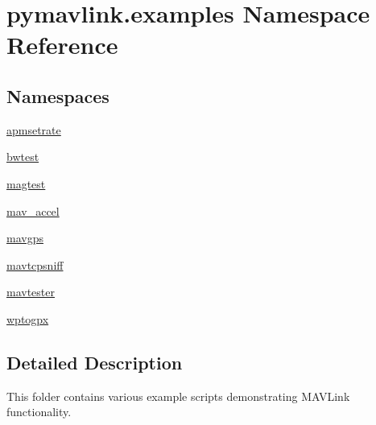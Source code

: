 \hypertarget{namespacepymavlink_1_1examples}{}\section{pymavlink.\+examples Namespace Reference}
\label{namespacepymavlink_1_1examples}
\subsection*{Namespaces}
\begin{DoxyCompactItemize}
\item 
 \hyperlink{namespacepymavlink_1_1examples_1_1apmsetrate}{apmsetrate}
\item 
 \hyperlink{namespacepymavlink_1_1examples_1_1bwtest}{bwtest}
\item 
 \hyperlink{namespacepymavlink_1_1examples_1_1magtest}{magtest}
\item 
 \hyperlink{namespacepymavlink_1_1examples_1_1mav__accel}{mav\+\_\+accel}
\item 
 \hyperlink{namespacepymavlink_1_1examples_1_1mavgps}{mavgps}
\item 
 \hyperlink{namespacepymavlink_1_1examples_1_1mavtcpsniff}{mavtcpsniff}
\item 
 \hyperlink{namespacepymavlink_1_1examples_1_1mavtester}{mavtester}
\item 
 \hyperlink{namespacepymavlink_1_1examples_1_1wptogpx}{wptogpx}
\end{DoxyCompactItemize}


\subsection{Detailed Description}
\begin{DoxyVerb}This folder contains various example scripts demonstrating MAVLink functionality.\end{DoxyVerb}
 